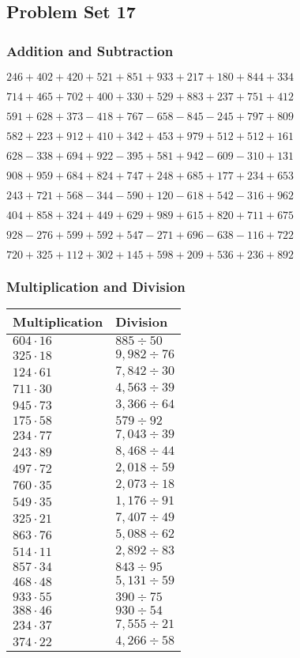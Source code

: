 \hypertarget{problem-set-17-2}{%
\subsection{Problem Set 17}\label{problem-set-17-2}}

\hypertarget{addition-and-subtraction-117}{%
\subsubsection{Addition and
Subtraction}\label{addition-and-subtraction-117}}

\(246 + 402 + 420 + 521 + 851 + 933 + 217 + 180 + 844 + 334\)

\(714 + 465 + 702 + 400 + 330 + 529 + 883 + 237 + 751 + 412\)

\(591 + 628 + 373 - 418 + 767 - 658 - 845 - 245 + 797 + 809\)

\(582 + 223 + 912 + 410 + 342 + 453 + 979 + 512 + 512 + 161\)

\(628 - 338 + 694 + 922 - 395 + 581 + 942 - 609 - 310 + 131\)

\(908 + 959 + 684 + 824 + 747 + 248 + 685 + 177 + 234 + 653\)

\(243 + 721 + 568 - 344 - 590 + 120 - 618 + 542 - 316 + 962\)

\(404 + 858 + 324 + 449 + 629 + 989 + 615 + 820 + 711 + 675\)

\(928 - 276 + 599 + 592 + 547 - 271 + 696 - 638 - 116 + 722\)

\(720 + 325 + 112 + 302 + 145 + 598 + 209 + 536 + 236 + 892\)

\hypertarget{multiplication-and-division-117}{%
\subsubsection{Multiplication and
Division}\label{multiplication-and-division-117}}

\begin{longtable}[]{@{}ll@{}}
\toprule
Multiplication & Division\tabularnewline
\midrule
\endhead
\(604 \cdot 16\) & \(885÷50\)\tabularnewline
\(325 \cdot 18\) & \(9,982÷76\)\tabularnewline
\(124 \cdot 61\) & \(7,842÷30\)\tabularnewline
\(711 \cdot 30\) & \(4,563÷39\)\tabularnewline
\(945 \cdot 73\) & \(3,366÷64\)\tabularnewline
\(175 \cdot 58\) & \(579÷92\)\tabularnewline
\(234 \cdot 77\) & \(7,043÷39\)\tabularnewline
\(243 \cdot 89\) & \(8,468÷44\)\tabularnewline
\(497 \cdot 72\) & \(2,018÷59\)\tabularnewline
\(760 \cdot 35\) & \(2,073÷18\)\tabularnewline
\(549 \cdot 35\) & \(1,176÷91\)\tabularnewline
\(325 \cdot 21\) & \(7,407÷49\)\tabularnewline
\(863 \cdot 76\) & \(5,088÷62\)\tabularnewline
\(514 \cdot 11\) & \(2,892÷83\)\tabularnewline
\(857 \cdot 34\) & \(843÷95\)\tabularnewline
\(468 \cdot 48\) & \(5,131÷59\)\tabularnewline
\(933 \cdot 55\) & \(390÷75\)\tabularnewline
\(388 \cdot 46\) & \(930÷54\)\tabularnewline
\(234 \cdot 37\) & \(7,555÷21\)\tabularnewline
\(374 \cdot 22\) & \(4,266÷58\)\tabularnewline
\bottomrule
\end{longtable}


